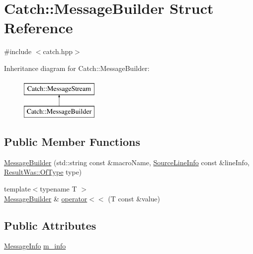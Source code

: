 \hypertarget{struct_catch_1_1_message_builder}{}\section{Catch\+:\+:Message\+Builder Struct Reference}
\label{struct_catch_1_1_message_builder}


{\ttfamily \#include $<$catch.\+hpp$>$}

Inheritance diagram for Catch\+:\+:Message\+Builder\+:\begin{figure}[H]
\begin{center}
\leavevmode
\includegraphics[height=2.000000cm]{struct_catch_1_1_message_builder}
\end{center}
\end{figure}
\subsection*{Public Member Functions}
\begin{DoxyCompactItemize}
\item 
\mbox{\hyperlink{struct_catch_1_1_message_builder_ab0c6378e722680bf58852c6ee2b6e724}{Message\+Builder}} (std\+::string const \&macro\+Name, \mbox{\hyperlink{struct_catch_1_1_source_line_info}{Source\+Line\+Info}} const \&line\+Info, \mbox{\hyperlink{struct_catch_1_1_result_was_a624e1ee3661fcf6094ceef1f654601ef}{Result\+Was\+::\+Of\+Type}} type)
\item 
{\footnotesize template$<$typename T $>$ }\\\mbox{\hyperlink{struct_catch_1_1_message_builder}{Message\+Builder}} \& \mbox{\hyperlink{struct_catch_1_1_message_builder_a20fa48d069b20dddcc2d3df8abb123c1}{operator$<$$<$}} (T const \&value)
\end{DoxyCompactItemize}
\subsection*{Public Attributes}
\begin{DoxyCompactItemize}
\item 
\mbox{\hyperlink{struct_catch_1_1_message_info}{Message\+Info}} \mbox{\hyperlink{struct_catch_1_1_message_builder_a979f1c2b36d78f80ee275bfa5ba0209f}{m\+\_\+info}}
\end{DoxyCompactItemize}


